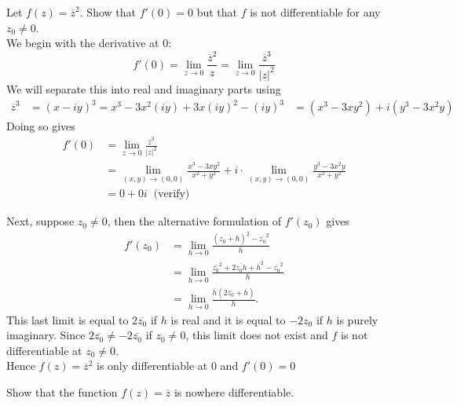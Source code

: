 \documentclass[handout]{ximera}
\begin{document}
\begin{example}
Let $f(z) = \overline{z}^2$.  Show that $f'(0) = 0$ but that $f$ is not differentiable for any $z_0 \neq 0$.\\
We begin with the derivative at $0$:
\[
f'(0) = \lim_{z \to  0} \frac{\overline{z}^2}{z} = \lim_{z \to  0} \frac{\overline{z}^3}{|z|^2}
\]
We will separate this into real and imaginary parts using 
\begin{align*}
\overline{z}^3 &= (x -iy)^3 = x^3 - 3x^2(iy) + 3x(iy)^2  - (iy)^3 
              &= (x^3 -3xy^2) + i(y^3 - 3x^2y)
\end{align*}
Doing so gives
\begin{align*}
f'(0) &= \lim_{z \to  0} \frac{\overline{z}^3}{|z|^2}\\
      &= \lim_{(x,y) \to (0,0)} \frac{x^3 -3xy^2}{x^2 +y^2} + i\cdot \lim_{(x,y) \to (0,0)} \frac{y^3 - 3x^2y}{x^2 +y^2}\\
      & = 0 + 0i \;\; \mbox{(verify)}
\end{align*}

Next, suppose $z_0 \neq 0$, then the alternative formulation of $f'(z_0)$ gives
\begin{align*}
f'(z_0) &= \lim_{h \to 0} \frac{\left(\overline{z_0 + h}\right)^2-\overline{z_0}^2 }{h}\\[6pt]
        &=\lim_{h \to 0} \frac{\overline{z_0}^2 +2\overline{z_0h}+ \overline{h}^2 -\overline{z_0}^2 }{h}\\[6pt]
        &=\lim_{h \to 0} \frac{\overline{h} \left(2\overline{z_0}+ \overline{h}\right)}{h}.
\end{align*}
This last limit is equal to $2\overline{z_0}$ if $h$ is real and it is equal to $-2z_0$ if $h$ is purely imaginary.
Since $2\overline{z_0} \neq -2\overline{z_0}$ if $z_0 \neq 0$, this limit does not exist and $f$ is not differentiable at $z_0 \neq 0$.\\
Hence $f(z) = \overline{z}^2$ is only differentiable at $0$ and $f'(0) = 0$

\end{example}


\begin{problem}
Show that the function $f(z) = \overline{z}$ is nowhere differentiable.
\end{problem}
\end{document}
